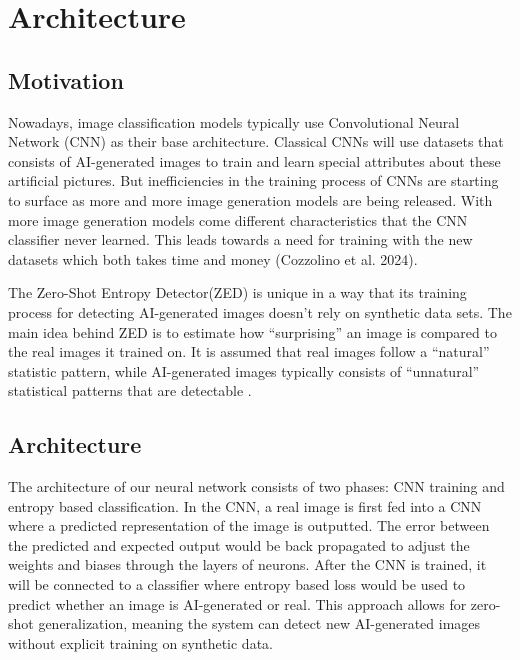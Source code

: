 \documentclass{article} %
\begin{document}
\section{Architecture}
\label{arch}
\subsection{Motivation}
Nowadays, image classification models typically use Convolutional Neural Network (CNN) as their base architecture. Classical CNNs will use datasets that consists of AI-generated images to train and learn special attributes about these artificial pictures. But inefficiencies in the training process of CNNs are starting to surface as more and more image generation models are being released. With more image generation models come different characteristics that the CNN classifier never learned. This leads towards a need for training with the new datasets which both takes time and money (Cozzolino et al. 2024).

The Zero-Shot Entropy Detector(ZED) is unique in a way that its training process for detecting AI-generated images doesn’t rely on synthetic data sets. The main idea behind ZED is to estimate how “surprising” an image is compared to the real images it trained on. It is assumed that real images follow a “natural” statistic pattern, while AI-generated images typically consists of “unnatural” statistical patterns that are detectable \citep{cozzolino2024zeroshotdetectionaigeneratedimages}.

\subsection{Architecture}
The architecture of our neural network consists of two phases: CNN training and entropy based classification. In the CNN, a real image is first fed into a CNN where a predicted representation of the image is outputted. The error between the predicted and expected output would be back propagated to adjust the weights and biases through the layers of neurons. After the CNN is trained, it will be connected to a classifier where entropy based loss would be used to predict whether an image is AI-generated or real. This approach allows for zero-shot generalization, meaning the system can detect new AI-generated images without explicit training on synthetic data.
\end{document}
